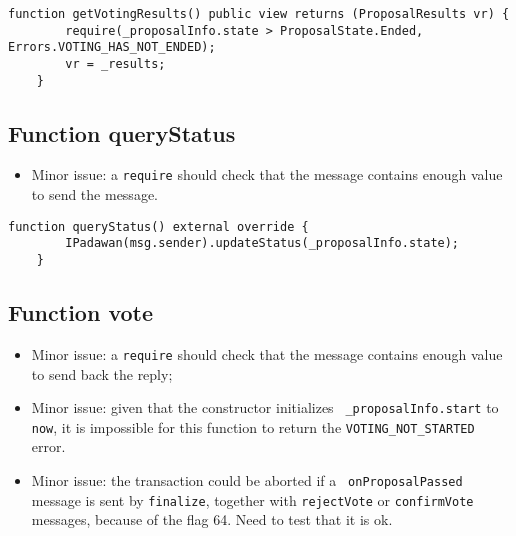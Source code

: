 \begin{lstlisting}[firstnumber=172]
    function getVotingResults() public view returns (ProposalResults vr) {
        require(_proposalInfo.state > ProposalState.Ended, Errors.VOTING_HAS_NOT_ENDED);
        vr = _results;
    }
\end{lstlisting}

\subsection{Function queryStatus}

\begin{itemize}
\item Minor issue: a {\tt require} should check that the message
  contains enough value to send the message.
\end{itemize}

\begin{lstlisting}[firstnumber=162]
    function queryStatus() external override {
        IPadawan(msg.sender).updateStatus(_proposalInfo.state);
    }
\end{lstlisting}

\subsection{Function vote}

\begin{itemize}
\item Minor issue: a {\tt require} should check that the message
  contains enough value to send back the reply;
\item Minor issue: given that the constructor initializes {\tt
  \_proposalInfo.start} to {\tt now}, it is impossible for this
  function to return the {\tt VOTING\_NOT\_STARTED} error.
\item Minor issue: the transaction could be aborted if a {\tt
  onProposalPassed} message is sent by {\tt finalize}, together with
  {\tt rejectVote} or {\tt confirmVote} messages, because of the flag 64.
  Need to test that it is ok.
\end{itemize}


